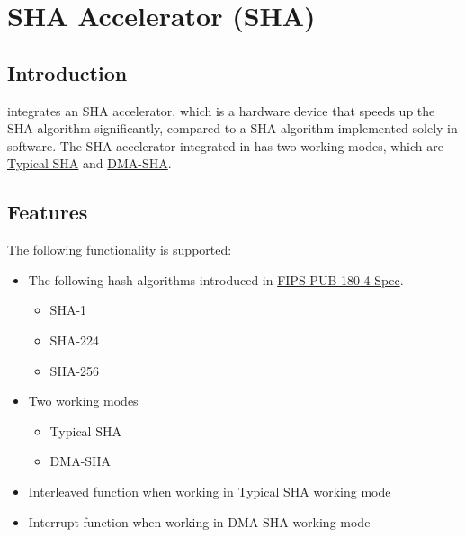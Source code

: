 \documentclass[main\_\_EN.tex]{subfiles}
\begin{document}

\ifglobal
\else
    {\let\clearpage\relax \listoftodos}
    {\let\clearpage\relax \listofdonetodos}
    \tableofcontents
\fi



\hypertarget{sha}{}
\chapter{SHA Accelerator (SHA)}
\label{mod:sha}
\section{Introduction}

\chipname{} integrates an SHA accelerator, which is a hardware device that speeds up the SHA algorithm significantly, compared to a SHA algorithm implemented solely in software. The SHA accelerator integrated in \chipname{} has two working modes, which are  \hyperref[sec:sha-typical-sha]{Typical SHA} and  \hyperref[sec:sha-dma-sha]{DMA-SHA}.

\section{Features}

The following functionality is supported:

\begin{itemize}
    \item The following hash algorithms introduced in   \href{https://doi.org/10.6028/NIST.FIPS.180-4}{FIPS PUB 180-4 Spec}.
    \begin{itemize}
        \item SHA-1
        \item SHA-224
        \item SHA-256
    \end{itemize}
    \item Two working modes
    \begin{itemize}
        \item Typical SHA 
        \item DMA-SHA  
    \end{itemize}
    \item Interleaved function when working in Typical SHA working mode
    \item Interrupt function when working in DMA-SHA working mode
\end{itemize}
\end{document}
